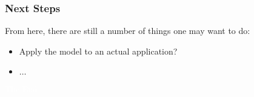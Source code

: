 \documentclass{beamer}
\begin{document}
\begin{frame}
  \frametitle{Next Steps}

  From here, there are still a number of things one may want to do:

  \begin{itemize}
  \item Apply the model to an actual application?
  \item $\ldots$
  \end{itemize}

\end{frame}


\bgroup
{}
\begin{frame}[t,plain]{}{}
  \begin{center}
    {\tiny \textcolor{white}{The End}}
  \end{center}
\end{frame}
\egroup
\end{document}

